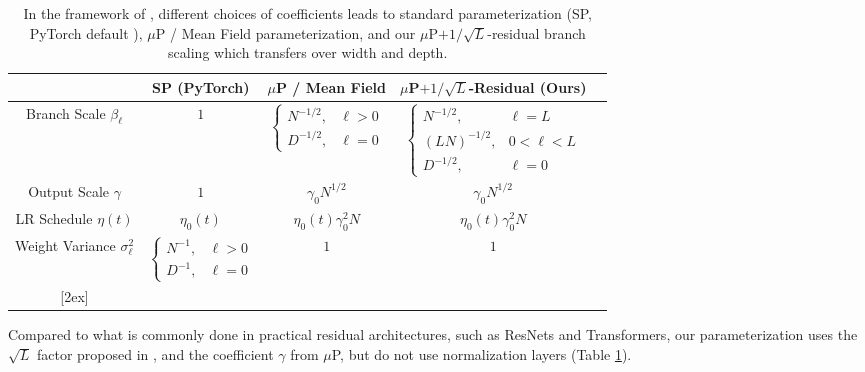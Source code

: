 \documentclass{article} %
\def\W{\bm W}
\begin{document}
\begin{table}[t!]
\centering
 \begin{tabular}{|c|c|c|c|c|} 
 \hline
  & SP (PyTorch) & $\mu$P / Mean Field & $\mu$P$+1/\sqrt{L}$-Residual (Ours) \\ [0.5ex] 
 \hline
 \rule{0pt}{2.25\normalbaselineskip}
 Branch Scale $\beta_\ell$ & $1$ & 
 $\begin{cases}
    N^{-1/2}, & \ell > 0 \\ 
    D^{-1/2}, & \ell = 0
 \end{cases}$  &
 $\begin{cases}
    N^{-1/2}, & \ell = L \\ 
    (LN)^{-1/2}, & 0 < \ell < L \\ 
    D^{-1/2}, & \ell = 0
 \end{cases}$
 \\ [3.5ex]
  \hline
  \rule{0pt}{1.0\normalbaselineskip}
 Output Scale $\gamma$ & $1$ & $\gamma_0 N^{1/2}$ & $\gamma_0 N^{1/2}$ \\ [0.5ex]
  \hline
  \rule{0pt}{1.1\normalbaselineskip}
 LR Schedule $\eta(t)$  & $\eta_0(t)$ & $\eta_0(t) \gamma_0^2 N$ & $\eta_0(t) \gamma_0^2 N$ \\ [0.7ex]
  \hline
  \rule{0pt}{1.6\normalbaselineskip}
 Weight Variance $\sigma_\ell^2$ & 
 $\begin{cases}
     N^{-1}, & \ell > 0 \\ 
     D^{-1}, & \ell = 0
 \end{cases}$ & $1$ & $1$ \\ 
 [2ex] 
 \hline
 \end{tabular}
 \caption{In the framework of , different choices of coefficients leads to standard parameterization (SP, PyTorch default \citep{paszke2019pytorch}), $\mu$P / Mean Field parameterization, and our $\mu$P$+ 1/\sqrt{L}$-residual branch scaling which transfers over width and depth.} 
 \label{tab:parameterizations}
\end{table}
%
Compared to what is commonly done in practical residual architectures, such as ResNets and Transformers, our parameterization uses the $\sqrt{L}$ factor proposed in \cite{hayou2021stable, fischer2023optimal}, and the coefficient $\gamma$ from $\mu$P, but do not use normalization layers (Table \ref{tab:parameterizations}). 
% 
\end{document}
